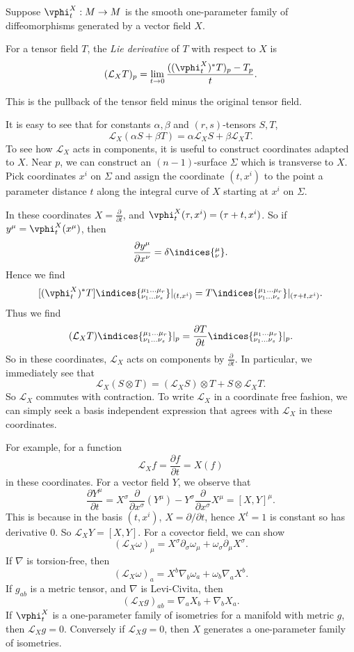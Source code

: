 \documentclass[12pt]{article}
\begin{document}
Suppose $\vphi_t^X : M \to M$ is the smooth one-parameter family of diffeomorphisms generated by a vector field $X$.

\begin{definition}
	For a tensor field $T$, the \emph{Lie derivative} of $T$ with respect to $X$ is
	\[
		(\mathcal{L}_X T)_p = \lim_{t \to 0} \frac{((\vphi_t^X)^{\ast} T)_p - T_p}{t}.
	\]
\end{definition}
This is the pullback of the tensor field minus the original tensor field.

It is easy to see that for constants $\alpha, \beta$ and $(r, s)$-tensors $S, T$,
\[
\mathcal{L}_X(\alpha S + \beta T) = \alpha \mathcal{L}_X S + \beta \mathcal{L}_X T.
\]
To see how $\mathcal{L}_X$ acts in components, it is useful to construct coordinates adapted to $X$. Near $p$, we can construct an $(n-1)$-surface $\Sigma$ which is transverse to $X$. Pick coordinates $x^i$ on $\Sigma$ and assign the coordinate $(t, x^i)$ to the point a parameter distance $t$ along the integral curve of $X$ starting at $x^i$ on $\Sigma$.

In these coordinates $X = \frac{\partial}{\partial t}$, and $\vphi_t^X(\tau, x^i) = (\tau + t, x^i)$. So if $y^{\mu} = \vphi_t^{X}(x^\mu)$, then
\[
\frac{\partial y^\mu}{\partial x^\nu} = \delta\indices{^{\mu}_{\nu}}.
\]
Hence we find
\[
	[(\vphi_t^X)^{\ast} T]\indices{^{\mu_1\ldots \mu_r}_{\nu_1 \ldots \nu_s}} |_{(t, x^i)} = T\indices{^{\mu_1 \ldots \mu_r}_{\nu_1 \ldots \nu_s}}|_{(\tau+ t, x^i)}.
\]
Thus we find
\[
	(\mathcal{L}_X T)\indices{^{\mu_1 \ldots \mu_r}_{\nu_1 \ldots \nu_s}}|_p = \frac{\partial T}{\partial t}\indices{^{\mu_1 \ldots \mu_r}_{\nu_1 \ldots \nu_s}}|_p.
\]
So in these coordinates, $\mathcal{L}_X$ acts on components by $\frac{\partial}{\partial t}$. In particular, we immediately see that
\[
\mathcal{L}_X(S \otimes T) = (\mathcal{L}_X S) \otimes T + S \otimes \mathcal{L}_X T.
\]
So $\mathcal{L}_X$ commutes with contraction. To write $\mathcal{L}_X$ in a coordinate free fashion, we can simply seek a basis independent expression that agrees with $\mathcal{L}_X$ in these coordinates.

For example, for a function
\[
\mathcal{L}_X f = \frac{\partial f}{\partial t} = X(f)
\]
in these coordinates. For a vector field $Y$, we observe that
\[
	\frac{\partial Y^\mu}{\partial t} =  X^\sigma \frac{\partial}{\partial x^\sigma} (Y^\mu) - Y^\sigma \frac{\partial}{\partial x^\sigma} X^\mu = [X, Y]^\mu.
\]
This is because in the basis $(t, x^i)$, $X = \partial/\partial t$, hence $X^t = 1$ is constant so has derivative 0. So $\mathcal{L}_X Y = [X, Y]$. For a covector field, we can show
\[
	(\mathcal{L}_X \omega)_\mu = X^\sigma \partial_\sigma \omega_\mu + \omega_\sigma \partial_\mu X^\sigma.
\]
If $\nabla$ is torsion-free, then
\[
	(\mathcal{L}_X \omega)_a = X^b \nabla_b \omega_a + \omega_b \nabla_a X^b.
\]
If $g_{ab}$ is a metric tensor, and $\nabla$ is Levi-Civita, then
\[
	(\mathcal{L}_X g)_{ab} = \nabla_a X_b + \nabla_b X_a.
\]
If $\vphi_t^X$ is a one-parameter family of isometries for a manifold with metric $g$, then $\mathcal{L}_X g = 0$. Conversely if $\mathcal{L}_X g = 0$, then $X$ generates a one-parameter family of isometries.
\end{document}
